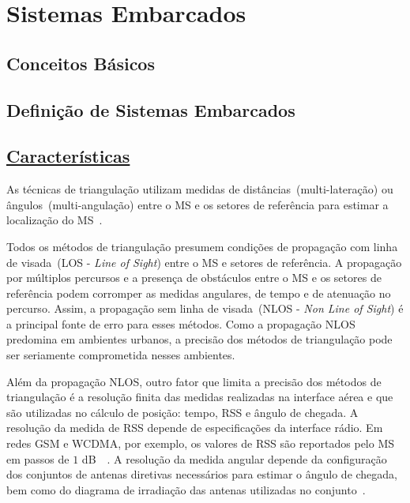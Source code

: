 \section{\textbf{Sistemas Embarcados}}
\label{sec:SistemasEmbarcados}
\subsection{Conceitos Básicos}

\subsection{Definição de Sistemas Embarcados}
\label{subsec:sub01_Definicao}

\subsection{\underline{Características}}
\label{subsec:sec1_Triangulacao}

As técnicas de triangulação utilizam medidas de distâncias~(multi-lateração) ou ângulos~(multi-angulação) entre o MS e os setores de referência para estimar a localização do MS~\cite{LocationMethodsSurvey2007}.

Todos os métodos de triangulação presumem condições de propagação com linha de visada~(LOS - \textit{Line of Sight}) entre o MS e setores de referência. A propagação por múltiplos percursos e a presença de obstáculos entre o MS e os setores de referência podem corromper as medidas angulares, de tempo e de atenuação no percurso. Assim, a propagação sem linha de visada~(NLOS - \textit{Non Line of Sight}) é a principal fonte de erro para esses métodos. Como a propagação NLOS predomina em ambientes urbanos, a precisão dos métodos de triangulação pode ser seriamente comprometida nesses ambientes.

Além da propagação NLOS, outro fator que limita a precisão dos métodos de triangulação é a resolução finita das medidas realizadas na interface aérea e que são utilizadas no cálculo de posição: tempo, RSS e ângulo de chegada. A resolução da medida de RSS depende de especificações da interface rádio. Em redes GSM e WCDMA, por exemplo, os valores de RSS são reportados pelo MS em passos de $1$ dB~\cite{ETSI100911}~\cite{3GPP25133}. A resolução da medida angular depende da configuração dos conjuntos de antenas diretivas necessários para estimar o ângulo de chegada, bem como do diagrama de irradiação das antenas utilizadas no conjunto~\cite{Rappaport1997}.

